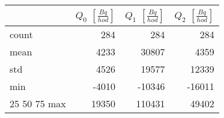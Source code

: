 \begin{tabular}{lrrr}
\toprule
{} &  $Q_0$ $\left[\si{\frac{Bq}{hod}}\right]$ &  $Q_1$ $\left[\si{\frac{Bq}{hod}}\right]$ &  $Q_2$ $\left[\si{\frac{Bq}{hod}}\right]$ \\
\midrule
count &                                       284 &                                       284 &                                       284 \\
mean  &                                      4233 &                                     30807 &                                      4359 \\
std   &                                      4526 &                                     19577 &                                     12339 \\
min   &                                     -4010 &                                    -10346 &                                    -16011 \\
25%
50%
75%
max   &                                     19350 &                                    110431 &                                     49402 \\
\bottomrule
\end{tabular}
